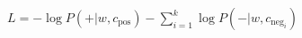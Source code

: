 \documentclass[preview]{standalone}
\begin{document}
\begin{align*}
L = -\log P(+|w, c_{\text{pos}}) - \sum_{i=1}^{k}\log P(-|w, c_{\text{neg}_i})
\end{align*}
\end{document}
